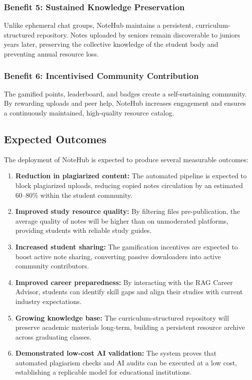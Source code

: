 \documentclass[12,Times new Roman,a4paper]{report}
\begin{document}
\subsubsection*{Benefit 5: Sustained Knowledge Preservation}
Unlike ephemeral chat groups, NoteHub maintains a persistent, curriculum-structured repository. Notes uploaded by seniors remain discoverable to juniors years later, preserving the collective knowledge of the student body and preventing annual resource loss.

\subsubsection*{Benefit 6: Incentivised Community Contribution}
The gamified points, leaderboard, and badges create a self-sustaining community. By rewarding uploads and peer help, NoteHub increases engagement and ensures a continuously maintained, high-quality resource catalog.

\subsection{Expected Outcomes}
The deployment of NoteHub is expected to produce several measurable outcomes:
\begin{enumerate}
    \item \textbf{Reduction in plagiarized content:} The automated pipeline is expected to block plagiarized uploads, reducing copied notes circulation by an estimated 60--80\% within the student community.
    \item \textbf{Improved study resource quality:} By filtering files pre-publication, the average quality of notes will be higher than on unmoderated platforms, providing students with reliable study guides.
    \item \textbf{Increased student sharing:} The gamification incentives are expected to boost active note sharing, converting passive downloaders into active community contributors.
    \item \textbf{Improved career preparedness:} By interacting with the RAG Career Advisor, students can identify skill gaps and align their studies with current industry expectations.
    \item \textbf{Growing knowledge base:} The curriculum-structured repository will preserve academic materials long-term, building a persistent resource archive across graduating classes.
    \item \textbf{Demonstrated low-cost AI validation:} The system proves that automated plagiarism checks and AI audits can be executed at a low cost, establishing a replicable model for educational institutions.
\end{enumerate}
\end{document}
